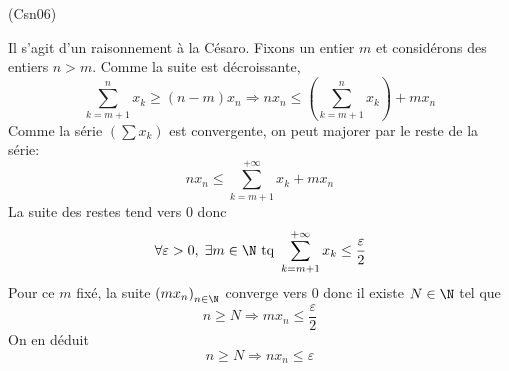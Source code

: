 \begin{tiny}(Csn06)\end{tiny} Il s'agit d'un raisonnement \og à la Césaro\fg.\newline 
Fixons un entier $m$ et considérons des entiers $n >m$. Comme la suite est décroissante,
\begin{displaymath}
 \sum_{k=m+1}^nx_k \geq (n-m)x_n 
 \Rightarrow 
 nx_n \leq \left( \sum_{k=m+1}^nx_k \right) + mx_n
\end{displaymath}
Comme la série $\left( \sum x_k\right)$ est convergente, on peut majorer par le reste de la série:
\begin{displaymath}
 nx_n \leq \sum_{k=m+1}^{+\infty}x_k + mx_n
\end{displaymath}
La suite des restes tend vers $0$ donc
\begin{displaymath}
 \forall \varepsilon >0, \; \exists m\in \N \text{ tq }
 \sum_{k=m+1}^{+\infty}x_k \leq \frac{\varepsilon}{2}
\end{displaymath}
Pour ce $m$ fixé, la suite $\left( m x_n \right)_{n \in \N}$ converge vers $0$ donc il existe $N\in \N$ tel que
\begin{displaymath}
 n \geq N \Rightarrow mx_n \leq \frac{\varepsilon}{2}
\end{displaymath}
On en déduit
\begin{displaymath}
 n \geq N \Rightarrow nx_n \leq \varepsilon
\end{displaymath}
